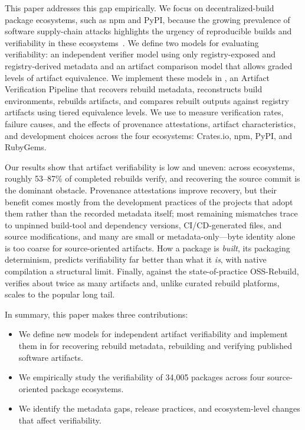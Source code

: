 This paper addresses this gap empirically. We focus on decentralized-build package ecosystems, such as npm and PyPI, because the growing prevalence of software supply-chain attacks highlights the urgency of reproducible builds and verifiability in these ecosystems~\cite{okafor_sok_2022,sonatype_state_2026}.
We define two models for evaluating verifiability: an independent verifier model using only registry-exposed and registry-derived metadata and an artifact comparison model that allows graded levels of artifact equivalence.
We implement these models in \toolname, an Artifact Verification Pipeline that recovers rebuild metadata, reconstructs build environments, rebuilds artifacts, and compares rebuilt outputs against registry artifacts using tiered equivalence levels. 
We use \toolname to measure verification rates, failure causes, and the effects of provenance attestations, artifact characteristics, and development choices across the four ecosystems: Crates.io, npm, PyPI, and RubyGems.


Our results show that artifact verifiability is low and uneven: across ecosystems, roughly 53–87\% of completed rebuilds verify, and recovering the source commit is the dominant obstacle. Provenance attestations improve recovery, but their benefit comes mostly from the development practices of the projects that adopt them rather than the recorded metadata itself; most remaining mismatches trace to unpinned build-tool and dependency versions, CI/CD-generated files, and source modifications, and many are small or metadata-only---byte identity alone is too coarse for source-oriented artifacts. How a package is \emph{built}, its packaging determinism, predicts verifiability far better than what it \emph{is}, with native compilation a structural limit. Finally, against the state-of-practice OSS-Rebuild, \toolname verifies about twice as many artifacts and, unlike curated rebuild platforms, scales to the popular long tail.

In summary, this paper makes three contributions:
\begin{itemize}
\item We define new models for independent artifact verifiability and implement them in \toolname for recovering rebuild metadata, rebuilding and verifying published software artifacts.
\item We empirically study the verifiability of 34{,}005 packages across four source-oriented package ecosystems.
\item We identify the metadata gaps, release practices, and ecosystem-level changes that affect verifiability.
\end{itemize}

